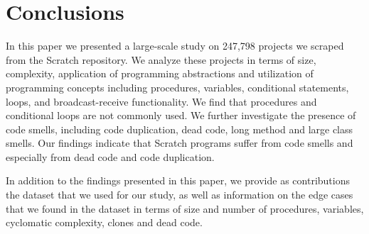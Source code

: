 \documentclass{sig-alternate}
\begin{document}

\section{Conclusions}
\label{sec:conclusion}
In this paper we presented a large-scale study on 247,798 projects we scraped from the Scratch repository. We analyze these projects in terms of size, complexity, application of programming abstractions and utilization of programming concepts including procedures, variables, conditional statements, loops, and broadcast-receive functionality. We find that procedures and conditional loops are not commonly used. We further investigate the presence of code smells, including code duplication, dead code, long method and large class smells. Our findings indicate that Scratch programs suffer from code smells and especially from dead code and code duplication.

In addition to the findings presented in this paper, we provide as contributions the dataset that we used for our study, as well as information on the edge cases that we found in the dataset in terms of size and number of procedures, variables, cyclomatic complexity, clones and dead code.\footnotemark[\ref{repo}]



\end{document}
